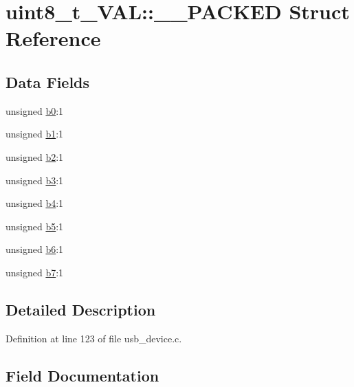 \hypertarget{structuint8__t___v_a_l_1_1_____p_a_c_k_e_d}{}\section{uint8\+\_\+t\+\_\+\+V\+AL\+::\+\_\+\+\_\+\+P\+A\+C\+K\+ED Struct Reference}
\label{structuint8__t___v_a_l_1_1_____p_a_c_k_e_d}
\subsection*{Data Fields}
\begin{DoxyCompactItemize}
\item 
unsigned \mbox{\hyperlink{structuint8__t___v_a_l_1_1_____p_a_c_k_e_d_a2579e7f4b9cf827f200a6db243400401}{b0}}\+:1
\item 
unsigned \mbox{\hyperlink{structuint8__t___v_a_l_1_1_____p_a_c_k_e_d_a64fb85a232132e073c328a71854d9ccf}{b1}}\+:1
\item 
unsigned \mbox{\hyperlink{structuint8__t___v_a_l_1_1_____p_a_c_k_e_d_a768fe0ee044e0b0d3fa1727ea4fa8a10}{b2}}\+:1
\item 
unsigned \mbox{\hyperlink{structuint8__t___v_a_l_1_1_____p_a_c_k_e_d_a9875b6b09b324ea739db10f0eabb4163}{b3}}\+:1
\item 
unsigned \mbox{\hyperlink{structuint8__t___v_a_l_1_1_____p_a_c_k_e_d_a02783ce5c818bd5feee68ec745a658ea}{b4}}\+:1
\item 
unsigned \mbox{\hyperlink{structuint8__t___v_a_l_1_1_____p_a_c_k_e_d_aabfdfc34204bc98e9f2228285847ec9f}{b5}}\+:1
\item 
unsigned \mbox{\hyperlink{structuint8__t___v_a_l_1_1_____p_a_c_k_e_d_a36234c4fc61c0ce84b860356586340a9}{b6}}\+:1
\item 
unsigned \mbox{\hyperlink{structuint8__t___v_a_l_1_1_____p_a_c_k_e_d_a52df3becc9eb59ad64eb7a4acad36c01}{b7}}\+:1
\end{DoxyCompactItemize}


\subsection{Detailed Description}


Definition at line 123 of file usb\+\_\+device.\+c.



\subsection{Field Documentation}
\mbox{\label{structuint8__t___v_a_l_1_1_____p_a_c_k_e_d_a2579e7f4b9cf827f200a6db243400401}} 
